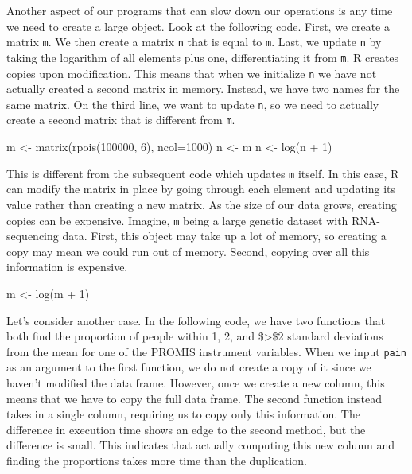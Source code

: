 \documentclass[
  letterpaper,
]{latex/krantz}
\makeatletter
\newenvironment{Shaded}{\begin{snugshade}}{\end{snugshade}}
\newcommand{\AttributeTok}[1]{\textcolor[rgb]{0.40,0.45,0.13}{#1}}
\newcommand{\DecValTok}[1]{\textcolor[rgb]{0.68,0.00,0.00}{#1}}
\newcommand{\FunctionTok}[1]{\textcolor[rgb]{0.28,0.35,0.67}{#1}}
\newcommand{\NormalTok}[1]{\textcolor[rgb]{0.00,0.23,0.31}{#1}}
\newcommand{\OtherTok}[1]{\textcolor[rgb]{0.00,0.23,0.31}{#1}}
\newcommand{\SpecialCharTok}[1]{\textcolor[rgb]{0.37,0.37,0.37}{#1}}
\newenvironment{kframe}{%
\medskip{}
\setlength{\fboxsep}{.8em}
 \def\at@end@of@kframe{}%
 \ifinner\ifhmode%
  \def\at@end@of@kframe{\end{minipage}}%
  \begin{minipage}{\columnwidth}%
 \fi\fi%
 \def\FrameCommand##1{\hskip\@totalleftmargin \hskip-\fboxsep
 \colorbox{shadecolor}{##1}\hskip-\fboxsep
     \hskip-\linewidth \hskip-\@totalleftmargin \hskip\columnwidth}%
 \MakeFramed {\advance\hsize-\width
   \@totalleftmargin\z@ \linewidth\hsize
   \@setminipage}}%
 {\par\unskip\endMakeFramed%
 \at@end@of@kframe}
\renewenvironment{Shaded}{\begin{kframe}}{\end{kframe}}
\makeatother
\begin{document}
Another aspect of our programs that can slow down our operations is any
time we need to create a large object. Look at the following code.
First, we create a matrix \texttt{m}. We then create a matrix \texttt{n}
that is equal to \texttt{m}. Last, we update \texttt{n} by taking the
logarithm of all elements plus one, differentiating it from \texttt{m}.
R creates copies upon modification. This means that when we initialize
\texttt{n} we have not actually created a second matrix in memory.
Instead, we have two names for the same matrix. On the third line, we
want to update \texttt{n}, so we need to actually create a second matrix
that is different from \texttt{m}.

\begin{Shaded}
\begin{Highlighting}[]
\NormalTok{m }\OtherTok{\textless{}{-}} \FunctionTok{matrix}\NormalTok{(}\FunctionTok{rpois}\NormalTok{(}\DecValTok{100000}\NormalTok{, }\DecValTok{6}\NormalTok{), }\AttributeTok{ncol=}\DecValTok{1000}\NormalTok{)}
\NormalTok{n }\OtherTok{\textless{}{-}}\NormalTok{ m}
\NormalTok{n }\OtherTok{\textless{}{-}} \FunctionTok{log}\NormalTok{(n }\SpecialCharTok{+} \DecValTok{1}\NormalTok{)}
\end{Highlighting}
\end{Shaded}

This is different from the subsequent code which updates \texttt{m}
itself. In this case, R can modify the matrix in place by going through
each element and updating its value rather than creating a new matrix.
As the size of our data grows, creating copies can be expensive.
Imagine, \texttt{m} being a large genetic dataset with RNA-sequencing
data. First, this object may take up a lot of memory, so creating a copy
may mean we could run out of memory. Second, copying over all this
information is expensive.

\begin{Shaded}
\begin{Highlighting}[]
\NormalTok{m }\OtherTok{\textless{}{-}} \FunctionTok{log}\NormalTok{(m }\SpecialCharTok{+} \DecValTok{1}\NormalTok{)}
\end{Highlighting}
\end{Shaded}

Let's consider another case. In the following code, we have two
functions that both find the proportion of people within 1, 2, and
\$\textgreater\$2 standard deviations from the mean for one of the
PROMIS instrument variables. When we input \texttt{pain} as an argument
to the first function, we do not create a copy of it since we haven't
modified the data frame. However, once we create a new column, this
means that we have to copy the full data frame. The second function
instead takes in a single column, requiring us to copy only this
information. The difference in execution time shows an edge to the
second method, but the difference is small. This indicates that actually
computing this new column and finding the proportions takes more time
than the duplication.
\end{document}
